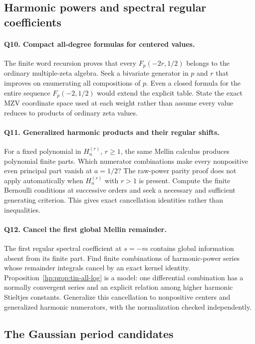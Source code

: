 \documentclass[11pt,a4paper]{article}
\numberwithin{equation}{section}
\theoremstyle{definition}
\theoremstyle{remark}
\begin{document}
\subsection{Harmonic powers and spectral regular coefficients}

\paragraph{Q10. Compact all-degree formulas for centered values.}
The finite word recursion proves that every
$F_p(-2r,1/2)$ belongs to the ordinary multiple-zeta algebra.
Seek a bivariate generator in $p$ and $r$ that improves on enumerating
all compositions of $p$. Even a closed formula for the entire sequence
$F_p(-2,1/2)$ would extend the explicit table. State the exact MZV
coordinate space used at each weight rather than assume every value
reduces to products of ordinary zeta values.

\paragraph{Q11. Generalized harmonic products and their regular shifts.}
For a fixed polynomial in $H_n^{(r)}$, $r\ge1$, the same Mellin
calculus produces polynomial finite parts. Which numerator combinations
make every nonpositive even principal part vanish at $a=1/2$?
The raw-power parity proof does not apply automatically when
$H_n^{(r)}$ with $r>1$ is present. Compute the finite Bernoulli
conditions at successive orders and seek a necessary and sufficient
generating criterion. This gives exact cancellation identities rather
than inequalities.

\paragraph{Q12. Cancel the first global Mellin remainder.}
The first regular spectral coefficient at $s=-m$ contains global
information absent from its finite part. Find finite combinations of
harmonic-power series whose remainder integrals cancel by an exact
kernel identity. Proposition~\ref{hp:prop:tin-all-log} is a model:
one differential combination has a normally convergent series and an
explicit relation among higher harmonic Stieltjes constants. Generalize
this cancellation to nonpositive centers and generalized harmonic
numerators, with the normalization checked independently.

\subsection{The Gaussian period candidates}
\end{document}
